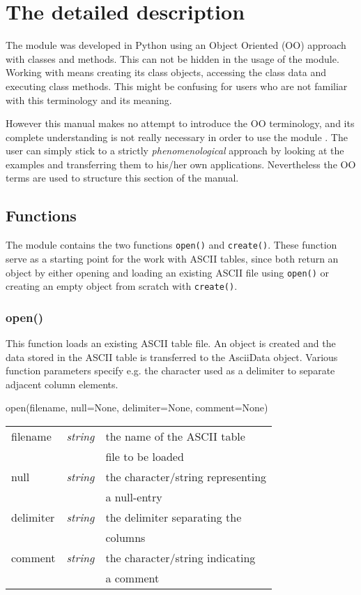 \section{The detailed description}
\label{details}
The \AAD module was developed in Python using an Object Oriented (OO) approach
with classes and methods. This can not be hidden in the usage of the
\AAD module.
Working with \AAD means creating its class objects, accessing the class data
and executing class methods. This might be confusing for users who are
not familiar with this terminology and its meaning.

However this manual makes no attempt to introduce the OO terminology,
and its complete understanding is not really necessary in order to use
the \AAD module . The user can simply stick to
a strictly {\it phenomenological} approach by looking at the examples
and transferring them to his/her own applications. Nevertheless the OO terms
are used to structure this section of the manual.

%
%
\subsection{Functions}
\label{functions}
The \AAD module contains the two functions {\tt open()} and {\tt create()}.
These function serve as a starting point for the work with ASCII tables,
since both return an \ad object by either opening  and loading
an existing ASCII file using {\tt open()} or creating an empty \ad object
from scratch with {\tt create()}.

\subsubsection{open()}
\label{functions_open}
This function loads an existing ASCII table file. An \ad object is
created and the data stored in the ASCII table is transferred to the
AsciiData object. Various function parameters specify e.g. the
character used as a delimiter to separate adjacent column elements.

open(filename, null=None, delimiter=None, comment=None)

\begin{tabular}{lcl}
filename &{\it string}& the name of the ASCII table\\
         &            &  file to be loaded\\
null     &{\it string}& the character/string representing\\
         &            & a null-entry\\
delimiter&{\it string}& the delimiter separating the\\
         &            & columns \\
comment  &{\it string}& the character/string indicating\\
         &            & a comment\\
\end{tabular}

